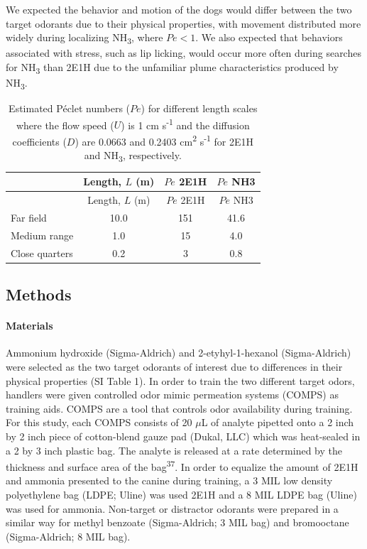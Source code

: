 \documentclass[
]{article}
\begin{document}
We expected the behavior and motion of the dogs would differ between the two target odorants due to their physical properties, with movement distributed more widely during localizing NH\textsubscript{3}, where \(Pe < 1\). We also expected that behaviors associated with stress, such as lip licking, would occur more often during searches for NH\textsubscript{3} than 2E1H due to the unfamiliar plume characteristics produced by NH\textsubscript{3}.

\begin{longtable}[]{@{}lccc@{}}
\caption{\label{tab:pe-table}Estimated Péclet numbers (\(Pe\)) for different length scales where the flow speed (\(U\)) is 1 cm s\textsuperscript{-1} and the diffusion coefficients (\(D\)) are 0.0663 and 0.2403 cm\textsuperscript{2} s\textsuperscript{-1} for 2E1H and NH\textsubscript{3}, respectively.}\tabularnewline
\toprule\noalign{}
& Length, \(L\) (m) & \(Pe\) 2E1H & \(Pe\) NH3 \\
\midrule\noalign{}
\endfirsthead
\toprule\noalign{}
& Length, \(L\) (m) & \(Pe\) 2E1H & \(Pe\) NH3 \\
\midrule\noalign{}
\endhead
\bottomrule\noalign{}
\endlastfoot
Far field & 10.0 & 151 & 41.6 \\
Medium range & 1.0 & 15 & 4.0 \\
Close quarters & 0.2 & 3 & 0.8 \\
\end{longtable}

\hypertarget{methods}{%
\subsection{Methods}\label{methods}}

\hypertarget{materials}{%
\paragraph{Materials}\label{materials}}

Ammonium hydroxide (Sigma-Aldrich) and 2-etyhyl-1-hexanol (Sigma-Aldrich) were selected as the two target odorants of interest due to differences in their physical properties (SI Table 1). In order to train the two different target odors, handlers were given controlled odor mimic permeation systems (COMPS) as training aids. COMPS are a tool that controls odor availability during training. For this study, each COMPS consists of 20 \(\mu\)L of analyte pipetted onto a 2 inch by 2 inch piece of cotton-blend gauze pad (Dukal, LLC) which was heat-sealed in a 2 by 3 inch plastic bag. The analyte is released at a rate determined by the thickness and surface area of the bag\textsuperscript{37}. In order to equalize the amount of 2E1H and ammonia presented to the canine during training, a 3 MIL low density polyethylene bag (LDPE; Uline) was used 2E1H and a 8 MIL LDPE bag (Uline) was used for ammonia. Non-target or distractor odorants were prepared in a similar way for methyl benzoate (Sigma-Aldrich; 3 MIL bag) and bromooctane (Sigma-Aldrich; 8 MIL bag).
\end{document}
